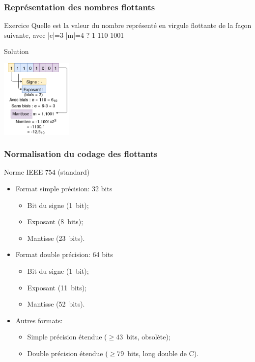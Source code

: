 \documentclass{beamer}
\begin{document}
  \begin{frame}
	\frametitle{Représentation des nombres flottants}
	\begin{block}{Exercice}
		Quelle est la valeur du nombre représenté en virgule flottante
		de la façon suivante, avec |e|=3 |m|=4 ?  1 110 1001
	\end{block}

		\begin{block}{Solution}
			\begin{center}
				\includegraphics[width=3.5cm]{img/flottant_nombre_a_deviner.png}
			\end{center}
		\end{block}
\end{frame}

\begin{frame}
	\frametitle{Normalisation du codage des flottants}
	
	\begin{block}{Norme IEEE 754 (standard)}
		\begin{itemize}
			\item Format simple précision: 32 bits
			\begin{itemize}
				\item Bit du signe (1~bit);
				\item Exposant (8~bits);
				\item Mantisse (23~bits).
			\end{itemize}
			
			\item Format double précision: 64 bits
			\begin{itemize}
				\item Bit du signe (1~bit);
				\item Exposant (11~bits);
				\item Mantisse (52~bits).
			\end{itemize}
			
			\item Autres formats:
			\begin{itemize}
				\item Simple précision étendue ($\geq{}43$~bits, obsolète);
				\item Double précision étendue ($\geq{}79$~bits, long double de C).
			\end{itemize}
		\end{itemize}
	\end{block}
\end{frame}
\end{document}
